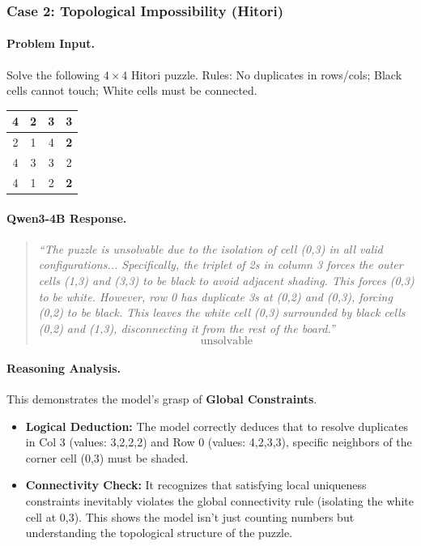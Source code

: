 \subsubsection*{Case 2: Topological Impossibility (Hitori)}

\paragraph{Problem Input.} 
Solve the following $4 \times 4$ Hitori puzzle. Rules: No duplicates in rows/cols; Black cells cannot touch; White cells must be connected.
\begin{center}
\small
\setlength{\tabcolsep}{4pt}
\begin{tabular}{|c|c|c|c|}
\hline
4 & 2 & \textbf{3} & \textbf{3} \\ \hline
2 & 1 & 4 & \textbf{2} \\ \hline
4 & 3 & 3 & 2 \\ \hline
4 & 1 & 2 & \textbf{2} \\ \hline
\end{tabular}
\end{center}

\paragraph{Qwen3-4B Response.}
\begin{quote}
\small
\textit{``The puzzle is unsolvable due to the isolation of cell (0,3) in all valid configurations... Specifically, the triplet of 2s in column 3 forces the outer cells (1,3) and (3,3) to be black to avoid adjacent shading. This forces (0,3) to be white. However, row 0 has duplicate 3s at (0,2) and (0,3), forcing (0,2) to be black. This leaves the white cell (0,3) surrounded by black cells (0,2) and (1,3), disconnecting it from the rest of the board.''}
\[ \boxed{\text{unsolvable}} \]
\end{quote}

\paragraph{Reasoning Analysis.}
This demonstrates the model's grasp of \textbf{Global Constraints}.
\begin{itemize}
    \item \textbf{Logical Deduction:} The model correctly deduces that to resolve duplicates in Col 3 (values: 3,2,2,2) and Row 0 (values: 4,2,3,3), specific neighbors of the corner cell (0,3) must be shaded.
    \item \textbf{Connectivity Check:} It recognizes that satisfying local uniqueness constraints inevitably violates the global connectivity rule (isolating the white cell at 0,3). This shows the model isn't just counting numbers but understanding the topological structure of the puzzle.
\end{itemize}

